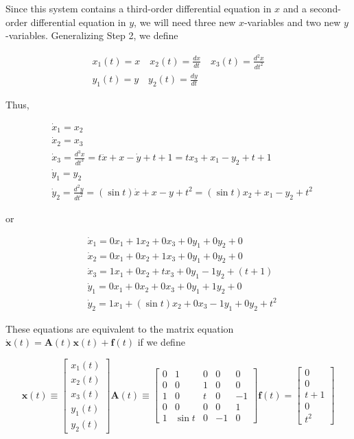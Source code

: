 \documentclass[10pt]{article}
\begin{document}
Since this system contains a third-order differential equation in $x$ and a second-order differential equation in $y$, we will need three new $x$-variables and two new $y$-variables. Generalizing Step 2, we define

$$
\begin{gathered}
x_{1}(t)=x \quad x_{2}(t)=\frac{d x}{d t} \quad x_{3}(t)=\frac{d^{2} x}{d t^{2}} \\
y_{1}(t)=y \quad y_{2}(t)=\frac{d y}{d t}
\end{gathered}
$$

Thus,

$$
\begin{aligned}
& \dot{x}_{1}=x_{2} \\
& \dot{x}_{2}=x_{3} \\
& \dot{x}_{3}=\frac{d^{3} x}{d t^{3}}=t \ddot{x}+x-\dot{y}+t+1=t x_{3}+x_{1}-y_{2}+t+1 \\
& \dot{y}_{1}=y_{2} \\
& \dot{y}_{2}=\frac{d^{2} y}{d t^{2}}=(\sin t) \dot{x}+x-y+t^{2}=(\sin t) x_{2}+x_{1}-y_{2}+t^{2}
\end{aligned}
$$

or

$$
\begin{aligned}
& \dot{x}_{1}=0 x_{1}+1 x_{2}+0 x_{3}+0 y_{1}+0 y_{2}+0 \\
& \dot{x}_{2}=0 x_{1}+0 x_{2}+1 x_{3}+0 y_{1}+0 y_{2}+0 \\
& \dot{x}_{3}=1 x_{1}+0 x_{2}+t x_{3}+0 y_{1}-1 y_{2}+(t+1) \\
& \dot{y}_{1}=0 x_{1}+0 x_{2}+0 x_{3}+0 y_{1}+1 y_{2}+0 \\
& \dot{y}_{2}=1 x_{1}+(\sin t) x_{2}+0 x_{3}-1 y_{1}+0 y_{2}+t^{2}
\end{aligned}
$$

These equations are equivalent to the matrix equation $\dot{\mathbf{x}}(t)=\mathbf{A}(t) \mathbf{x}(t)+\mathbf{f}(t)$ if we define

$$
\mathbf{x}(t) \equiv\left[\begin{array}{l}
x_{1}(t) \\
x_{2}(t) \\
x_{3}(t) \\
y_{1}(t) \\
y_{2}(t)
\end{array}\right] \mathbf{A}(t) \equiv\left[\begin{array}{cccrr}
0 & 1 & 0 & 0 & 0 \\
0 & 0 & 1 & 0 & 0 \\
1 & 0 & t & 0 & -1 \\
0 & 0 & 0 & 0 & 1 \\
1 & \sin t & 0 & -1 & 0
\end{array}\right] \mathbf{f}(t)=\left[\begin{array}{c}
0 \\
0 \\
t+1 \\
0 \\
t^{2}
\end{array}\right]
$$
\end{document}
